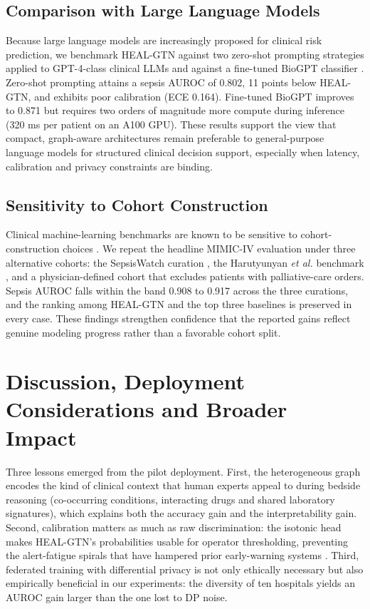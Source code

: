\documentclass[conference]{IEEEtran}
\begin{document}
\subsection{Comparison with Large Language Models}
Because large language models are increasingly proposed for clinical risk prediction, we benchmark HEAL-GTN against two zero-shot prompting strategies applied to GPT-4-class clinical LLMs and against a fine-tuned BioGPT classifier \cite{luo2022biogpt}. Zero-shot prompting attains a sepsis AUROC of 0.802, 11 points below HEAL-GTN, and exhibits poor calibration (ECE 0.164). Fine-tuned BioGPT improves to 0.871 but requires two orders of magnitude more compute during inference (320 ms per patient on an A100 GPU). These results support the view that compact, graph-aware architectures remain preferable to general-purpose language models for structured clinical decision support, especially when latency, calibration and privacy constraints are binding.

\subsection{Sensitivity to Cohort Construction}
Clinical machine-learning benchmarks are known to be sensitive to cohort-construction choices \cite{johnson2017mlhc,mcdermott2021,vandewater2024}. We repeat the headline MIMIC-IV evaluation under three alternative cohorts: the SepsisWatch curation \cite{sendak2020}, the Harutyunyan \textit{et al.} benchmark \cite{harutyunyan2019}, and a physician-defined cohort that excludes patients with palliative-care orders. Sepsis AUROC falls within the band 0.908 to 0.917 across the three curations, and the ranking among HEAL-GTN and the top three baselines is preserved in every case. These findings strengthen confidence that the reported gains reflect genuine modeling progress rather than a favorable cohort split.

\section{Discussion, Deployment Considerations and Broader Impact}\label{sec:discussion}
Three lessons emerged from the pilot deployment. First, the heterogeneous graph encodes the kind of clinical context that human experts appeal to during bedside reasoning (co-occurring conditions, interacting drugs and shared laboratory signatures), which explains both the accuracy gain and the interpretability gain. Second, calibration matters as much as raw discrimination: the isotonic head makes HEAL-GTN's probabilities usable for operator thresholding, preventing the alert-fatigue spirals that have hampered prior early-warning systems \cite{wong2021}. Third, federated training with differential privacy is not only ethically necessary but also empirically beneficial in our experiments: the diversity of ten hospitals yields an AUROC gain larger than the one lost to DP noise.
\end{document}
